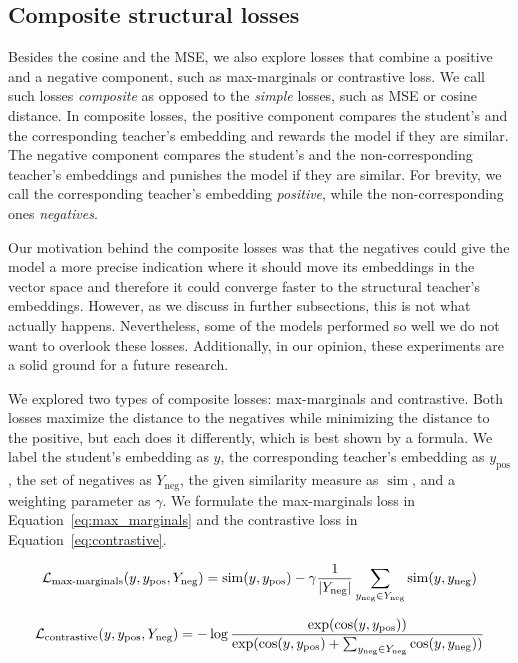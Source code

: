 \subsection{Composite structural losses}\label{section:composite_losses}

Besides the cosine and the MSE, we also explore losses that combine a positive
and a negative component, such as max-marginals or contrastive loss. We call
such losses \emph{composite} as opposed to the \emph{simple} losses, such as MSE
or cosine distance. In composite losses, the positive component compares the
student's and the corresponding teacher's embedding and rewards the model if
they are similar. The negative component compares the student's and the
non-corresponding teacher's embeddings and punishes the model if they are
similar. For brevity, we call the corresponding teacher's embedding
\emph{positive}, while the non-corresponding ones \emph{negatives}.

Our motivation behind the composite losses was that the negatives could give
the model a more precise indication where it should move its embeddings in the
vector space and therefore it could converge faster to the structural teacher's
embeddings. However, as we discuss in further subsections, this is not what
actually happens. Nevertheless, some of the models performed so well we do not
want to overlook these losses. Additionally, in our opinion, these experiments
are a solid ground for a future research.

We explored two types of composite losses: max-marginals and contrastive. Both
losses maximize the distance to the negatives while minimizing the distance to
the positive, but each does it differently, which is best shown by a formula.
We label the student's embedding as $y$, the corresponding teacher's embedding
as $y_{\text{pos}}$, the set of negatives as $Y_{\text{neg}}$, the given
similarity measure as $\operatorname{sim}$, and a weighting parameter as
$\gamma$. We formulate the max-marginals loss in
Equation~\ref{eq:max_marginals} and the contrastive loss in
Equation~\ref{eq:contrastive}.


\begin{equation}
  \mathcal{L}_{\text{max-marginals}}(y, y_\text{pos}, Y_\text{neg}) =
    \operatorname{sim}(y, y_\text{pos}) -
    \gamma \frac{1}{|Y_\text{neg}|} \sum_{y_\text{neg} \in Y_\text{neg}}
      \operatorname{sim}(y, y_\text{neg})
  \label{eq:max_marginals}
\end{equation}

\begin{equation}
  \mathcal{L}_{\text{contrastive}}(y, y_\text{pos}, Y_\text{neg}) =
    -\log \frac{
      \exp(\cos(y, y_\text{pos}))
    }{
      \exp(
        \cos(y, y_\text{pos}) +
        \sum_{y_\text{neg} \in Y_\text{neg}} \cos(y, y_\text{neg})
      )
    }
  \label{eq:contrastive}
\end{equation}


